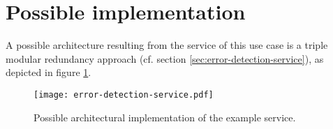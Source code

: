 \section{Possible implementation}

A possible architecture resulting from the service of this use case is a triple modular redundancy approach (cf. section \ref{sec:error-detection-service}), as depicted in figure \ref{fig:example-service-architecture}. 


\begin{figure}[ht]
\centering
\texttt{[image: error-detection-service.pdf]}
\caption{Possible architectural implementation of the example service.}
\label{fig:example-service-architecture}
\end{figure}